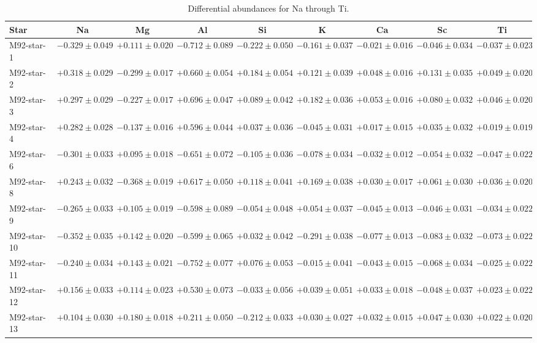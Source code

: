 \begin{table}
\caption{Differential abundances for Na through Ti.}\label{tab:abund1}
\begin{tabular*}{\textheight}{@{\extracolsep\fill}l c c c c c c c c@{}}
\toprule
Star & Na & Mg & Al & Si & K & Ca & Sc & Ti \\ \midrule
M92-star-1 & $-0.329 \pm 0.049$ & $+0.111 \pm 0.020$ & $-0.712 \pm 0.089$ & $-0.222 \pm 0.050$ & $-0.161 \pm 0.037$ & $-0.021 \pm 0.016$ & $-0.046 \pm 0.034$ & $-0.037 \pm 0.023$ \\ 
M92-star-2 & $+0.318 \pm 0.029$ & $-0.299 \pm 0.017$ & $+0.660 \pm 0.054$ & $+0.184 \pm 0.054$ & $+0.121 \pm 0.039$ & $+0.048 \pm 0.016$ & $+0.131 \pm 0.035$ & $+0.049 \pm 0.020$ \\ 
M92-star-3 & $+0.297 \pm 0.029$ & $-0.227 \pm 0.017$ & $+0.696 \pm 0.047$ & $+0.089 \pm 0.042$ & $+0.182 \pm 0.036$ & $+0.053 \pm 0.016$ & $+0.080 \pm 0.032$ & $+0.046 \pm 0.020$ \\ 
M92-star-4 & $+0.282 \pm 0.028$ & $-0.137 \pm 0.016$ & $+0.596 \pm 0.044$ & $+0.037 \pm 0.036$ & $-0.045 \pm 0.031$ & $+0.017 \pm 0.015$ & $+0.035 \pm 0.032$ & $+0.019 \pm 0.019$ \\ 
M92-star-6 & $-0.301 \pm 0.033$ & $+0.095 \pm 0.018$ & $-0.651 \pm 0.072$ & $-0.105 \pm 0.036$ & $-0.078 \pm 0.034$ & $-0.032 \pm 0.012$ & $-0.054 \pm 0.032$ & $-0.047 \pm 0.022$ \\ 
M92-star-8 & $+0.243 \pm 0.032$ & $-0.368 \pm 0.019$ & $+0.617 \pm 0.050$ & $+0.118 \pm 0.041$ & $+0.169 \pm 0.038$ & $+0.030 \pm 0.017$ & $+0.061 \pm 0.030$ & $+0.036 \pm 0.020$ \\ 
M92-star-9 & $-0.265 \pm 0.033$ & $+0.105 \pm 0.019$ & $-0.598 \pm 0.089$ & $-0.054 \pm 0.048$ & $+0.054 \pm 0.037$ & $-0.045 \pm 0.013$ & $-0.046 \pm 0.031$ & $-0.034 \pm 0.022$ \\ 
M92-star-10 & $-0.352 \pm 0.035$ & $+0.142 \pm 0.020$ & $-0.599 \pm 0.065$ & $+0.032 \pm 0.042$ & $-0.291 \pm 0.038$ & $-0.077 \pm 0.013$ & $-0.083 \pm 0.032$ & $-0.073 \pm 0.022$ \\ 
M92-star-11 & $-0.240 \pm 0.034$ & $+0.143 \pm 0.021$ & $-0.752 \pm 0.077$ & $+0.076 \pm 0.053$ & $-0.015 \pm 0.041$ & $-0.043 \pm 0.015$ & $-0.068 \pm 0.034$ & $-0.025 \pm 0.022$ \\ 
M92-star-12 & $+0.156 \pm 0.033$ & $+0.114 \pm 0.023$ & $+0.530 \pm 0.073$ & $-0.033 \pm 0.056$ & $+0.039 \pm 0.051$ & $+0.033 \pm 0.018$ & $-0.048 \pm 0.037$ & $+0.023 \pm 0.022$ \\ 
M92-star-13 & $+0.104 \pm 0.030$ & $+0.180 \pm 0.018$ & $+0.211 \pm 0.050$ & $-0.212 \pm 0.033$ & $+0.030 \pm 0.027$ & $+0.032 \pm 0.015$ & $+0.047 \pm 0.030$ & $+0.022 \pm 0.020$ \\ 

\end{tabular*}
\end{table}
